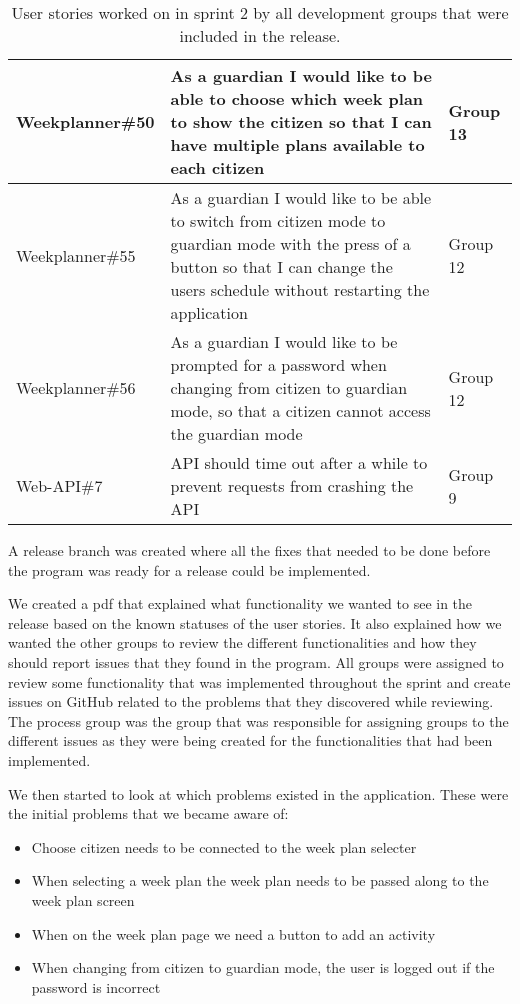 \begin{table}[H]
\begin{tabular}{|p{2.8cm}|p{7cm}|p{2cm}|}
    Weekplanner\#50 & As a guardian I would like to be able to choose which week plan to show the citizen so that I can have multiple plans available to each citizen                                          & Group 13            \\ \hline
    Weekplanner\#55 & As a guardian I would like to be able to switch from citizen mode to guardian mode with the press of a button so that I can change the users schedule without restarting the application & Group 12            \\ \hline
    Weekplanner\#56 & As a guardian I would like to be prompted for a password when changing from citizen to guardian mode, so that a citizen cannot access the guardian mode                                  & Group 12            \\ \hline
    Web-API\#7      & API should time out after a while to prevent requests from crashing the API                                                                                                              & Group 9             \\ \hline
    \end{tabular}
    \caption{User stories worked on in sprint 2 by all development groups that were included in the release.}\label{table:user-stories-sprint-2-release}
\end{table}

\noindent A release branch was created where all the fixes that needed to be done before the program was ready for a release could be implemented.

\noindent We created a pdf that explained what functionality we wanted to see in the release based on the known statuses of the user stories.
It also explained how we wanted the other groups to review the different functionalities and how they should report issues that they found in the program.
All groups were assigned to review some functionality that was implemented throughout the sprint and create issues on GitHub related to the problems that they discovered while reviewing. 
The process group was the group that was responsible for assigning groups to the different issues as they were being created for the functionalities that had been implemented. 

\noindent We then started to look at which problems existed in the application.
These were the initial problems that we became aware of:
\begin{itemize}
    \item Choose citizen needs to be connected to the week plan selecter
    \item When selecting a week plan the week plan needs to be passed along to the week plan screen
    \item When on the week plan page we need a button to add an activity
    \item When changing from citizen to guardian mode, the user is logged out if the password is incorrect
\end{itemize}

